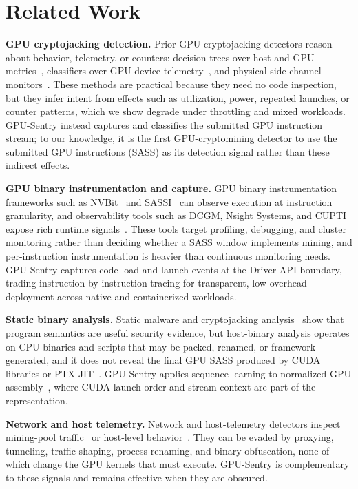 \section{Related Work}
\label{sec:related}

\textbf{GPU cryptojacking detection.}
Prior GPU cryptojacking detectors reason about behavior, telemetry, or counters: decision trees over host and GPU metrics~\cite{tanana2024gpucryptojacking}, classifiers over GPU device telemetry~\cite{pott2023gpucryptojacking}, and physical side-channel monitors~\cite{xiao2023magtracer,cao2025maginspector}. These methods are practical because they need no code inspection, but they infer intent from effects such as utilization, power, repeated launches, or counter patterns, which we show degrade under throttling and mixed workloads. GPU-Sentry instead captures and classifies the submitted GPU instruction stream; to our knowledge, it is the first GPU-cryptomining detector to use the submitted GPU instructions (SASS) as its detection signal rather than these indirect effects.

\textbf{GPU binary instrumentation and capture.}
GPU binary instrumentation frameworks such as NVBit~\cite{villa2019nvbit} and SASSI~\cite{stephenson2015sassi} can observe execution at instruction granularity, and observability tools such as DCGM, Nsight Systems, and CUPTI expose rich runtime signals~\cite{dcgm,nsight-systems,cutpi}. These tools target profiling, debugging, and cluster monitoring rather than deciding whether a SASS window implements mining, and per-instruction instrumentation is heavier than continuous monitoring needs. GPU-Sentry captures code-load and launch events at the Driver-API boundary, trading instruction-by-instruction tracing for transparent, low-overhead deployment across native and containerized workloads.

\textbf{Static binary analysis.}
Static malware and cryptojacking analysis~\cite{tekiner2021sok} show that program semantics are useful security evidence, but host-binary analysis operates on CPU binaries and scripts that may be packed, renamed, or framework-generated, and it does not reveal the final GPU SASS produced by CUDA libraries or PTX JIT~\cite{hayes2019decodingcuda,roels2025sass}. GPU-Sentry applies sequence learning to normalized GPU assembly~\cite{li2021palmtree,wang2022jtrans}, where CUDA launch order and stream context are part of the representation.

\textbf{Network and host telemetry.}
Network and host-telemetry detectors inspect mining-pool traffic~\cite{caprolu2021cryptomining} or host-level behavior~\cite{tahir2017mining}. They can be evaded by proxying, tunneling, traffic shaping, process renaming, and binary obfuscation, none of which change the GPU kernels that must execute. GPU-Sentry is complementary to these signals and remains effective when they are obscured.

